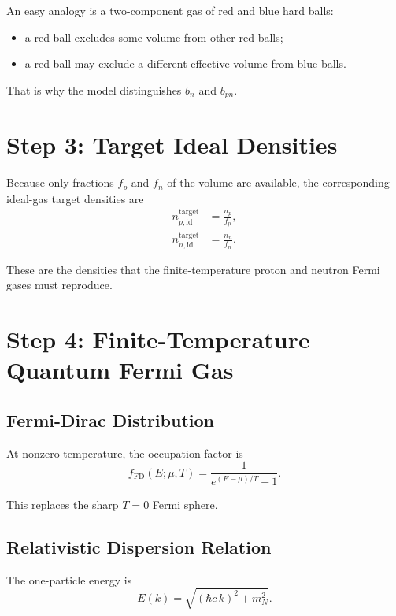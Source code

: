 \documentclass[11pt]{article}
\begin{document}
An easy analogy is a two-component gas of red and blue hard balls:
\begin{itemize}
\item a red ball excludes some volume from other red balls;
\item a red ball may exclude a different effective volume from blue balls.
\end{itemize}

That is why the model distinguishes $b_n$ and $b_{pn}$.

\section{Step 3: Target Ideal Densities}

Because only fractions $f_p$ and $f_n$ of the volume are available, the
corresponding ideal-gas target densities are
\begin{align}
n_{p,\mathrm{id}}^{\mathrm{target}} &= \frac{n_p}{f_p}, \\
n_{n,\mathrm{id}}^{\mathrm{target}} &= \frac{n_n}{f_n}.
\end{align}

These are the densities that the finite-temperature proton and neutron Fermi
gases must reproduce.

\section{Step 4: Finite-Temperature Quantum Fermi Gas}

\subsection{Fermi-Dirac Distribution}

At nonzero temperature, the occupation factor is
\begin{equation}
f_{\mathrm{FD}}(E;\mu,T)=\frac{1}{e^{(E-\mu)/T}+1}.
\end{equation}

This replaces the sharp $T=0$ Fermi sphere.

\subsection{Relativistic Dispersion Relation}

The one-particle energy is
\begin{equation}
E(k)=\sqrt{(\hbar c\,k)^2+m_N^2}.
\end{equation}
\end{document}
